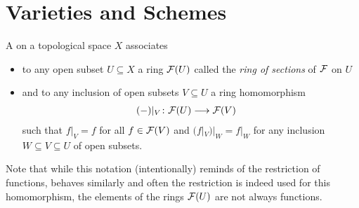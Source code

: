 \documentclass[a4paper,parskip=full,numbers=enddot]{scrreprt}
\begin{document}
\chapter{Varieties and Schemes}
\begin{defi}
    A  on a topological space $X$ associates 
    \begin{itemize}
    	\item to any open subset $U\subseteq X$ a ring $\mathcal{F}(U)$ called the \emph{ring of sections} of $\mathcal{F}$ on $U$
    	\item and to any inclusion of open subsets $V\subseteq U$ a ring homomorphism 
    	\begin{align*}
    	(-)|_V\colon \mathcal{F}(U) &\longrightarrow \mathcal{F}(V)
    	\end{align*}
    	such that $f|_V = f$ for all $f\in\mathcal{F}(V)$ and $(f|_V)|_W = f|_W$ for any inclusion $W\subseteq V\subseteq U$ of open subsets.
    \end{itemize}  Note that while this notation (intentionally) reminds of the restriction of functions, behaves similarly and often the restriction is indeed used for this homomorphism, the elements of the rings $\mathcal{F}(U)$ are not always functions. 
    

\end{defi}
\end{document}
